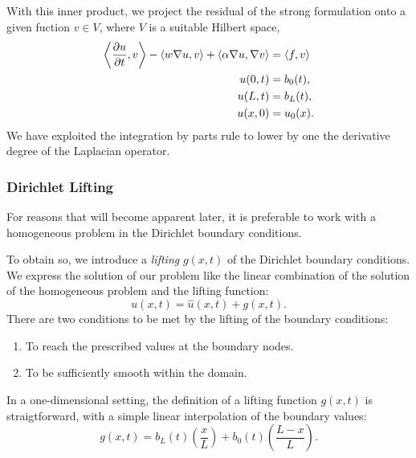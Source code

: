 \documentclass[../../main.tex]{subfiles}
\newcommand{\inner}[2]{\left<#1, #2\right>}
\begin{document}
With this inner product, we project the residual of the strong formulation onto a given fuction $v \in V$,
where $V$ is a suitable Hilbert space,
\begin{subequations}
    \begin{align}
        \label{eq:1d_fom_weak_formulation}
        \inner{\frac{\partial u}{\partial t}}{v} - \inner{w \grad u}{v} + \inner{\alpha \grad u}{\grad v} &= \inner{f}{v} \\
        u(0, t) &= b_0(t), \\
        u(L, t) &= b_L(t), \\
        u(x, 0) &= u_0(x).
    \end{align}
\end{subequations}
We have exploited the integration by parts rule to lower by one the derivative degree of the Laplacian operator.

\subsubsection{Dirichlet Lifting}
\label{sec:1d_fom_heat_equation_dirichlet_lifting}
For reasons that will become apparent later, it is preferable to work with a homogeneous problem in the Dirichlet boundary conditions.

To obtain so, we introduce a \emph{lifting} $g(x,t)$ of the Dirichlet boundary conditions.
We express the solution of our problem like the linear combination of the solution of the homogeneous problem and the lifting function:
\begin{equation}
    \label{eq:1d_fom_homogeneous_plus_lifting}
    u(x,t) = \hat{u}(x,t) + g(x,t).
\end{equation}
There are two conditions to be met by the lifting of the boundary conditions:
\begin{enumerate}
    \item To reach the prescribed values at the boundary nodes.
    \item To be sufficiently smooth within the domain.
\end{enumerate}
In a one-dimensional setting, the definition of a lifting function $g(x,t)$ is straigtforward, with a simple linear interpolation of the boundary values:
\begin{equation}
    \label{eq:1d_fom_dirichlet_lifting}
    g(x,t) = b_L(t) \left(\frac{x}{L}\right) + b_0(t) \left(\frac{L - x}{L}\right).
\end{equation}
\end{document}
